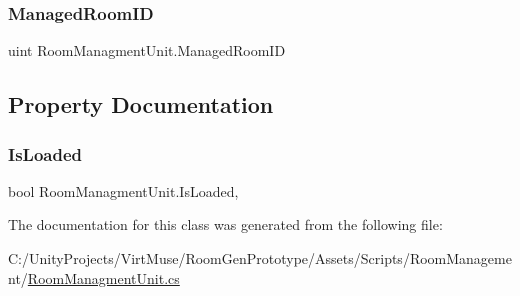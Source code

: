 \mbox{\label{class_room_managment_unit_a3a8836466231ec4cc95a2328cf246a75}} 
\subsubsection{\texorpdfstring{Managed\+Room\+ID}{ManagedRoomID}}
{\footnotesize\ttfamily uint Room\+Managment\+Unit.\+Managed\+Room\+ID\hspace{0.3cm}{\ttfamily [private]}}



\subsection{Property Documentation}
\mbox{\label{class_room_managment_unit_a221d94b284d9888e753699938f9e7809}} 
\subsubsection{\texorpdfstring{Is\+Loaded}{IsLoaded}}
{\footnotesize\ttfamily bool Room\+Managment\+Unit.\+Is\+Loaded\hspace{0.3cm}{\ttfamily [get]}, {}}



The documentation for this class was generated from the following file\+:\begin{DoxyCompactItemize}
\item 
C\+:/\+Unity\+Projects/\+Virt\+Muse/\+Room\+Gen\+Prototype/\+Assets/\+Scripts/\+Room\+Management/\mbox{\hyperlink{_room_managment_unit_8cs}{Room\+Managment\+Unit.\+cs}}\end{DoxyCompactItemize}
